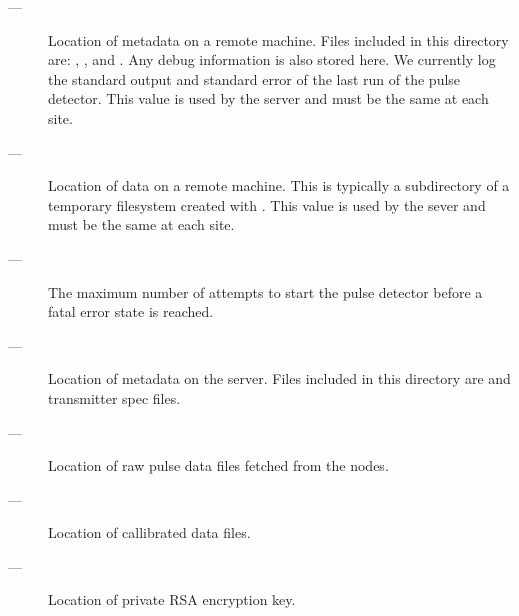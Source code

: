 \documentclass[letter]{article}
\begin{document}
\begin{description}
  \item[\quad {} ---] Location of metadata on a remote 
   machine. Files included in this directory are: , , 
   and . Any debug information is also stored here. We currently 
   log the standard output and standard error of the last run of the pulse detector. 
   This value is used by the server and must be the same at each site. 

  \item[\quad {} ---] Location of data on a remote machine. 
   This is typically a subdirectory of a temporary filesystem created with 
   . This value is used by the sever and must be the same at 
   each site. 
  
  \item[\quad {} ---] The maximum number of attempts to start the 
   pulse detector before a fatal error state is reached. 
   
  \item[\quad {} ---] Location of metadata on the 
   server. Files included in this directory are  and transmitter
   spec files.

  \item[\quad {} ---] Location of raw pulse data files 
   fetched from the nodes.
  
  \item[\quad {} ---] Location of callibrated data files. 
  
  \item[\quad {} ---] Location of private RSA encryption
   key. 
  
\end{description}
\end{document}
